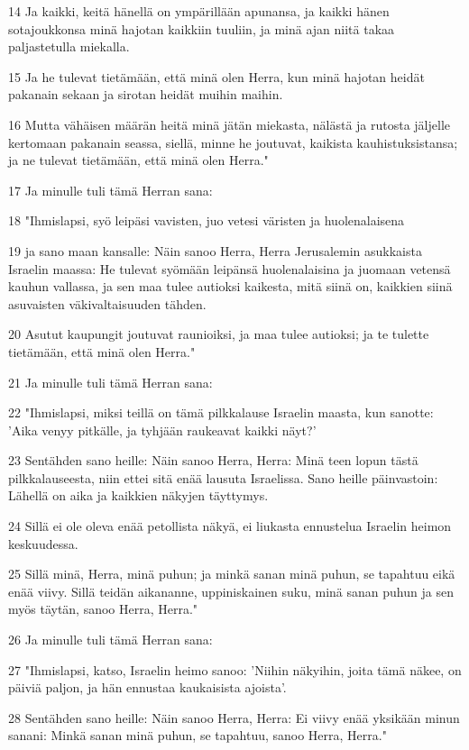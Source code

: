 \par 14 Ja kaikki, keitä hänellä on ympärillään apunansa, ja kaikki hänen sotajoukkonsa minä hajotan kaikkiin tuuliin, ja minä ajan niitä takaa paljastetulla miekalla.
\par 15 Ja he tulevat tietämään, että minä olen Herra, kun minä hajotan heidät pakanain sekaan ja sirotan heidät muihin maihin.
\par 16 Mutta vähäisen määrän heitä minä jätän miekasta, nälästä ja rutosta jäljelle kertomaan pakanain seassa, siellä, minne he joutuvat, kaikista kauhistuksistansa; ja ne tulevat tietämään, että minä olen Herra."
\par 17 Ja minulle tuli tämä Herran sana:
\par 18 "Ihmislapsi, syö leipäsi vavisten, juo vetesi väristen ja huolenalaisena
\par 19 ja sano maan kansalle: Näin sanoo Herra, Herra Jerusalemin asukkaista Israelin maassa: He tulevat syömään leipänsä huolenalaisina ja juomaan vetensä kauhun vallassa, ja sen maa tulee autioksi kaikesta, mitä siinä on, kaikkien siinä asuvaisten väkivaltaisuuden tähden.
\par 20 Asutut kaupungit joutuvat raunioiksi, ja maa tulee autioksi; ja te tulette tietämään, että minä olen Herra."
\par 21 Ja minulle tuli tämä Herran sana:
\par 22 "Ihmislapsi, miksi teillä on tämä pilkkalause Israelin maasta, kun sanotte: 'Aika venyy pitkälle, ja tyhjään raukeavat kaikki näyt?'
\par 23 Sentähden sano heille: Näin sanoo Herra, Herra: Minä teen lopun tästä pilkkalauseesta, niin ettei sitä enää lausuta Israelissa. Sano heille päinvastoin: Lähellä on aika ja kaikkien näkyjen täyttymys.
\par 24 Sillä ei ole oleva enää petollista näkyä, ei liukasta ennustelua Israelin heimon keskuudessa.
\par 25 Sillä minä, Herra, minä puhun; ja minkä sanan minä puhun, se tapahtuu eikä enää viivy. Sillä teidän aikananne, uppiniskainen suku, minä sanan puhun ja sen myös täytän, sanoo Herra, Herra."
\par 26 Ja minulle tuli tämä Herran sana:
\par 27 "Ihmislapsi, katso, Israelin heimo sanoo: 'Niihin näkyihin, joita tämä näkee, on päiviä paljon, ja hän ennustaa kaukaisista ajoista'.
\par 28 Sentähden sano heille: Näin sanoo Herra, Herra: Ei viivy enää yksikään minun sanani: Minkä sanan minä puhun, se tapahtuu, sanoo Herra, Herra."


